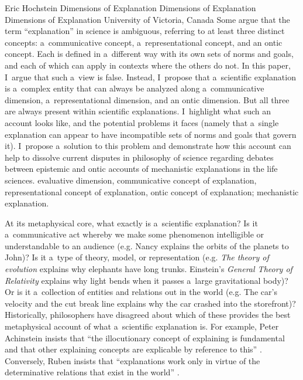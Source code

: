 \begin{artengenv}{Eric Hochstein}
	{Dimensions of Explanation}
	{Dimensions of Explanation}
	{Dimensions of Explanation}
	{University of Victoria, Canada}
	{Some argue that the term ``explanation'' in science is ambiguous, referring to at least three distinct concepts: a~communicative concept, a~representational concept, and an ontic concept. Each is defined in a~different way with its own sets of norms and goals, and each of which can apply in contexts where the others do not. In this paper, I~argue that such a~view is false. Instead, I~propose that a~scientific explanation is a~complex entity that can always be analyzed along a~communicative dimension, a~representational dimension, and an ontic dimension. But all three are always present within scientific explanations. I~highlight what such an account looks like, and the potential problems it faces (namely that a~single explanation can appear to have incompatible sets of norms and goals that govern it). I~propose a~solution to this problem and demonstrate how this account can help to dissolve current disputes in philosophy of science regarding debates between epistemic and ontic accounts of mechanistic explanations in the life sciences.
	}
	{evaluative dimension, communicative concept of explanation, representational concept of explanation, ontic concept of explanation; mechanistic explanation.}




\lettrine[loversize=0.13,lines=2,lraise=-0.03,nindent=0em,findent=0.2pt]%
{A}{}t its metaphysical core, what exactly is a~scientific explanation? Is it a~communicative act whereby we make some phenomenon intelligible or understandable to an audience (e.g. Nancy explains the orbits of the planets to John)? Is it a~type of theory, model, or representation (e.g. \textit{The theory of evolution} explains why elephants have long trunks. Einstein's \textit{General Theory of} \textit{Relativity} explains why light bends when it passes a~large gravitational body)? Or is it a~collection of entities and relations out in the world (e.g. The car's velocity and the cut break line explains why the car crashed into the storefront)? Historically, philosophers have disagreed about which of these provides the best metaphysical account of what a~scientific explanation is. For example, Peter Achinstein insists that ``the illocutionary concept of explaining is fundamental and that other explaining concepts are explicable by reference to this''
\parencite*[][p.22]{achinstein_pragmatic_1984}. %
 Conversely, Ruben insists that ``explanations work only in virtue of the determinative relations that exist in the world'' 
\parencite[][p.231]{ruben_explaining_1990}.%



\end{artengenv}
